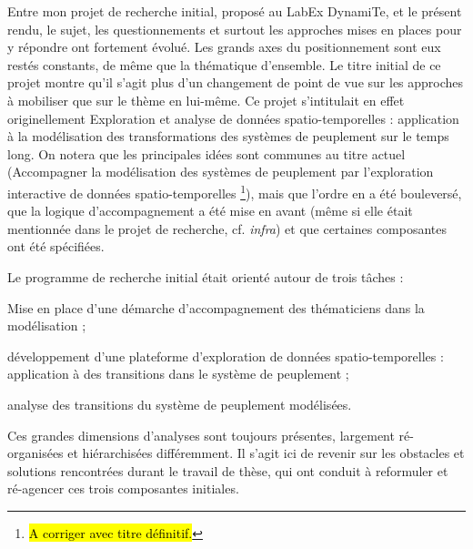 Entre mon projet de recherche initial, proposé au LabEx DynamiTe, et le présent rendu, le sujet, les questionnements et surtout les approches mises en places pour y répondre ont fortement évolué.
Les grands axes du positionnement sont eux restés constants, de même que la thématique d'ensemble.
Le titre initial de ce projet montre qu'il s'agit plus d'un changement de point de vue sur les approches à mobiliser que sur le thème en lui-même.
Ce projet s'intitulait en effet originellement \og Exploration et analyse de données spatio-temporelles : application à la modélisation des transformations des systèmes de peuplement sur le temps long\fg{}.
On notera que les principales idées sont communes au titre actuel (\og Accompagner la modélisation des systèmes de peuplement par l'exploration interactive de données spatio-temporelles \fg{}\footnote{
	\hl{A corriger avec titre définitif.}
}), mais que l'ordre en a été bouleversé, que la logique d'accompagnement a été mise en avant (même si elle était mentionnée dans le projet de recherche, cf. \textit{infra}) et que certaines composantes ont été spécifiées.

Le programme de recherche initial était orienté autour de trois tâches :

\begin{compactenum}\vspace*{-.5em}
	\item \og Mise en place d'une démarche d'accompagnement des thématiciens dans la modélisation\fg{} ;
	\item \og développement d'une plateforme d'exploration de données spatio-temporelles : application à des transitions dans le système de peuplement\fg{} ;
	\item \og analyse des transitions du système de peuplement modélisées\fg{}.
\end{compactenum}\vspace*{-.5em}

Ces grandes dimensions d'analyses sont toujours présentes, largement ré-organisées et hiérarchisées différemment.
Il s'agit ici de revenir sur les obstacles et solutions rencontrées durant le travail de thèse, qui ont conduit à reformuler et ré-agencer ces trois composantes initiales.



